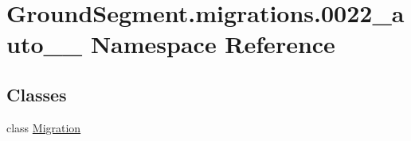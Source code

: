 \hypertarget{namespace_ground_segment_1_1migrations_1_10022__auto__20161202__1258}{}\section{Ground\+Segment.\+migrations.0022\+\_\+auto\+\_\+\_ Namespace Reference}
\label{namespace_ground_segment_1_1migrations_1_10022__auto__20161202__1258}
\subsection*{Classes}
\begin{DoxyCompactItemize}
\item 
class \hyperlink{class_ground_segment_1_1migrations_1_10022__auto__20161202__1258_1_1_migration}{Migration}
\end{DoxyCompactItemize}
